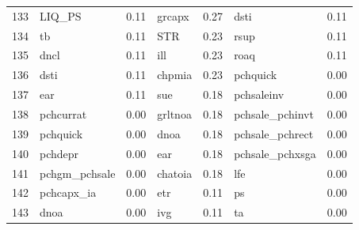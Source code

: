 \begin{footnotesize}
\begin{longtable}{rlc|lc|lc}
		133                       & LIQ\_PS                     & 0.11                          & grcapx                      & 0.27                          & dsti                              & 0.11           \\
		134                       & tb                          & 0.11                          & STR                         & 0.23                          & rsup                              & 0.11           \\
		135                       & dncl                        & 0.11                          & ill                         & 0.23                          & roaq                              & 0.11           \\
		136                       & dsti                        & 0.11                          & chpmia                      & 0.23                          & pchquick                          & 0.00           \\
		137                       & ear                         & 0.11                          & sue                         & 0.18                          & pchsaleinv                        & 0.00           \\
		138                       & pchcurrat                   & 0.00                          & grltnoa                     & 0.18                          & pchsale\_pchinvt                  & 0.00           \\
		139                       & pchquick                    & 0.00                          & dnoa                        & 0.18                          & pchsale\_pchrect                  & 0.00           \\
		140                       & pchdepr                     & 0.00                          & ear                         & 0.18                          & pchsale\_pchxsga                  & 0.00           \\
		141                       & pchgm\_pchsale              & 0.00                          & chatoia                     & 0.18                          & lfe                               & 0.00           \\
		142                       & pchcapx\_ia                 & 0.00                          & etr                         & 0.11                          & ps                                & 0.00           \\
		143                       & dnoa                        & 0.00                          & ivg                         & 0.11                          & ta                                & 0.00           \\

\end{longtable}
\end{footnotesize}
